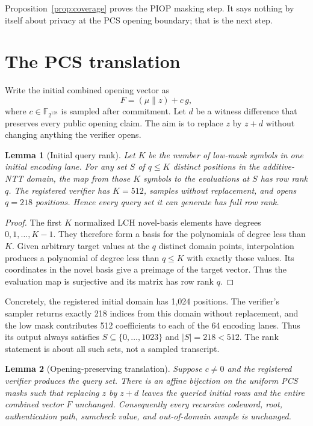 \documentclass[11pt]{article}
\newtheorem{lemma}{Lemma}
\theoremstyle{definition}
\newcommand{\F}{\mathbb{F}}
\newcommand{\K}{\F_{2^{128}}}
\begin{document}
Proposition~\ref{prop:coverage} proves the PIOP masking step.  It says nothing by
itself about privacy at the PCS opening boundary; that is the next step.

\section{The PCS translation}\label{sec:s3}

Write the initial combined opening vector as
\[
  F=(\mu\parallel z)+c\,g,
\]
where $c\in\K$ is sampled after commitment.  Let $d$ be a witness difference
that preserves every public opening claim.  The aim is to replace $z$ by
$z+d$ without changing anything the verifier opens.

\begin{lemma}[Initial query rank]\label{lem:l0-rank}
Let $K$ be the number of low-mask symbols in one initial encoding lane.  For
any set $S$ of $q\le K$ distinct positions in the additive-NTT domain, the map
from those $K$ symbols to the evaluations at $S$ has row rank $q$.  The
registered verifier has $K=512$, samples without replacement, and opens
$q=218$ positions.  Hence every query set it can generate has full row rank.
\end{lemma}

\begin{proof}
The first $K$ normalized LCH novel-basis elements have degrees
$0,1,\ldots,K-1$.  They therefore form a basis for the polynomials of degree
less than $K$.  Given arbitrary target values at the $q$ distinct domain
points, interpolation produces a polynomial of degree less than $q\le K$ with
exactly those values.  Its coordinates in the novel basis give a preimage of
the target vector.  Thus the evaluation map is surjective and its matrix has
row rank $q$.
\end{proof}

Concretely, the registered initial domain has 1,024 positions.  The verifier's
sampler returns exactly 218 indices from this domain without replacement, and
the low mask contributes 512 coefficients to each of the 64 encoding lanes.
Thus its output always satisfies $S\subseteq\{0,\ldots,1023\}$ and
$|S|=218<512$.  The rank statement is about all such sets, not a sampled
transcript.

\begin{lemma}[Opening-preserving translation]\label{lem:pcs}
Suppose $c\ne0$ and the registered verifier produces the query set.  There is
an affine bijection on the uniform PCS masks such that replacing $z$ by $z+d$
leaves the queried initial rows and the entire combined vector $F$ unchanged.
Consequently every recursive codeword, root, authentication path, sumcheck
value, and out-of-domain sample is unchanged.
\end{lemma}
\end{document}
